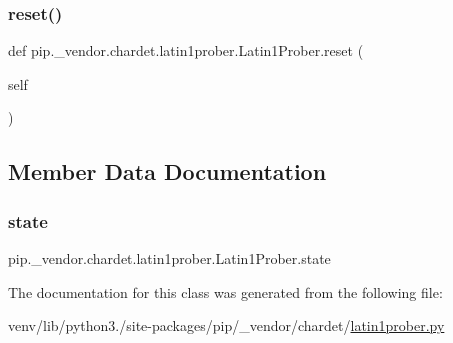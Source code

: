 \subsubsection{\texorpdfstring{reset()}{reset()}}
{\footnotesize\ttfamily def pip.\+\_\+vendor.\+chardet.\+latin1prober.\+Latin1\+Prober.\+reset (\begin{DoxyParamCaption}\item[{}]{self }\end{DoxyParamCaption})}



\subsection{Member Data Documentation}
\mbox{\label{classpip_1_1__vendor_1_1chardet_1_1latin1prober_1_1Latin1Prober_a6bcc5503fcc2f33ef3739d96848db0f1}} 
\subsubsection{\texorpdfstring{state}{state}}
{\footnotesize\ttfamily pip.\+\_\+vendor.\+chardet.\+latin1prober.\+Latin1\+Prober.\+state}



The documentation for this class was generated from the following file\+:\begin{DoxyCompactItemize}
\item 
venv/lib/python3./site-\/packages/pip/\+\_\+vendor/chardet/\hyperlink{latin1prober_8py}{latin1prober.\+py}\end{DoxyCompactItemize}
